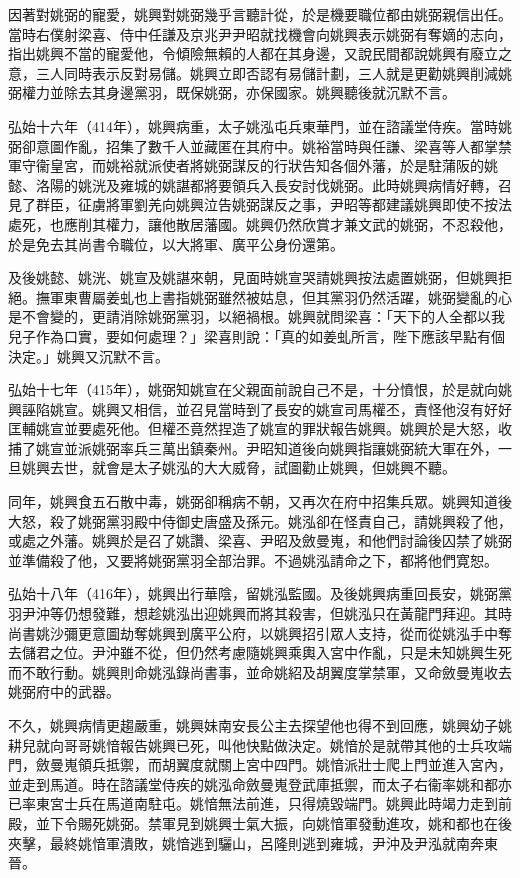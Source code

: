 因著對姚弼的寵愛，姚興對姚弼幾乎言聽計從，於是機要職位都由姚弼親信出任。當時右僕射梁喜、侍中任謙及京兆尹尹昭就找機會向姚興表示姚弼有奪嫡的志向，指出姚興不當的寵愛他，令傾險無賴的人都在其身邊，又說民間都說姚興有廢立之意，三人同時表示反對易儲。姚興立即否認有易儲計劃，三人就是更勸姚興削減姚弼權力並除去其身邊黨羽，既保姚弼，亦保國家。姚興聽後就沉默不言。

弘始十六年（414年），姚興病重，太子姚泓屯兵東華門，並在諮議堂侍疾。當時姚弼卻意圖作亂，招集了數千人並藏匿在其府中。姚裕當時與任謙、梁喜等人都掌禁軍守衞皇宮，而姚裕就派使者將姚弼謀反的行狀告知各個外藩，於是駐蒲阪的姚懿、洛陽的姚洸及雍城的姚諶都將要領兵入長安討伐姚弼。此時姚興病情好轉，召見了群臣，征虜將軍劉羌向姚興泣告姚弼謀反之事，尹昭等都建議姚興即使不按法處死，也應削其權力，讓他散居藩國。姚興仍然欣賞才兼文武的姚弼，不忍殺他，於是免去其尚書令職位，以大將軍、廣平公身份還第。

及後姚懿、姚洸、姚宣及姚諶來朝，見面時姚宣哭請姚興按法處置姚弼，但姚興拒絕。撫軍東曹屬姜虬也上書指姚弼雖然被姑息，但其黨羽仍然活躍，姚弼變亂的心是不會變的，更請消除姚弼黨羽，以絕禍根。姚興就問梁喜：「天下的人全都以我兒子作為口實，要如何處理？」梁喜則說：「真的如姜虬所言，陛下應該早點有個決定。」姚興又沉默不言。

弘始十七年（415年），姚弼知姚宣在父親面前說自己不是，十分憤恨，於是就向姚興誣陷姚宣。姚興又相信，並召見當時到了長安的姚宣司馬權丕，責怪他沒有好好匡輔姚宣並要處死他。但權丕竟然捏造了姚宣的罪狀報告姚興。姚興於是大怒，收捕了姚宣並派姚弼率兵三萬出鎮秦州。尹昭知道後向姚興指讓姚弼統大軍在外，一旦姚興去世，就會是太子姚泓的大大威脅，試圖勸止姚興，但姚興不聽。

同年，姚興食五石散中毒，姚弼卻稱病不朝，又再次在府中招集兵眾。姚興知道後大怒，殺了姚弼黨羽殿中侍御史唐盛及孫元。姚泓卻在怪責自己，請姚興殺了他，或處之外藩。姚興於是召了姚讚、梁喜、尹昭及斂曼嵬，和他們討論後囚禁了姚弼並準備殺了他，又要將姚弼黨羽全部治罪。不過姚泓請命之下，都將他們寛恕。

弘始十八年（416年），姚興出行華陰，留姚泓監國。及後姚興病重回長安，姚弼黨羽尹沖等仍想發難，想趁姚泓出迎姚興而將其殺害，但姚泓只在黃龍門拜迎。其時尚書姚沙彌更意圖劫奪姚興到廣平公府，以姚興招引眾人支持，從而從姚泓手中奪去儲君之位。尹沖雖不從，但仍然考慮隨姚興乘輿入宮中作亂，只是未知姚興生死而不敢行動。姚興則命姚泓錄尚書事，並命姚紹及胡翼度掌禁軍，又命斂曼嵬收去姚弼府中的武器。

不久，姚興病情更趨嚴重，姚興妹南安長公主去探望他也得不到回應，姚興幼子姚耕兒就向哥哥姚愔報告姚興已死，叫他快點做決定。姚愔於是就帶其他的士兵攻端門，斂曼嵬領兵抵禦，而胡翼度就關上宮中四門。姚愔派壯士爬上門並進入宮內，並走到馬道。時在諮議堂侍疾的姚泓命斂曼嵬登武庫抵禦，而太子右衞率姚和都亦已率東宮士兵在馬道南駐屯。姚愔無法前進，只得燒毀端門。姚興此時竭力走到前殿，並下令賜死姚弼。禁軍見到姚興士氣大振，向姚愔軍發動進攻，姚和都也在後夾擊，最終姚愔軍潰敗，姚愔逃到驪山，呂隆則逃到雍城，尹沖及尹泓就南奔東晉。

